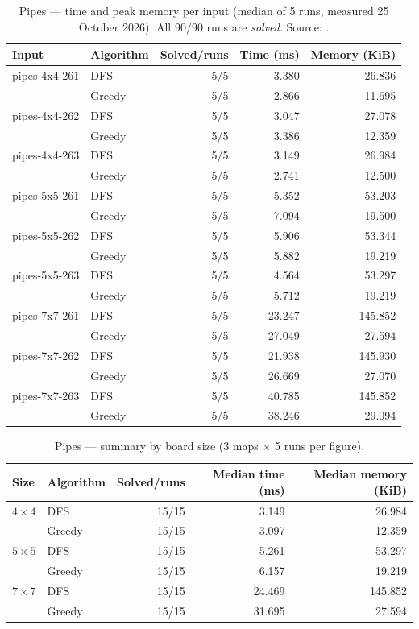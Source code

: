 \begin{table}[h]
\centering\small
\begin{tabular}{@{}llrrr@{}}
\toprule
Input & Algorithm & Solved/runs & Time (ms) & Memory (KiB)\\
\midrule
pipes-4x4-261 & DFS    & 5/5 & 3.380  & 26.836\\
              & Greedy & 5/5 & 2.866  & 11.695\\
\midrule
pipes-4x4-262 & DFS    & 5/5 & 3.047  & 27.078\\
              & Greedy & 5/5 & 3.386  & 12.359\\
\midrule
pipes-4x4-263 & DFS    & 5/5 & 3.149  & 26.984\\
              & Greedy & 5/5 & 2.741  & 12.500\\
\midrule
pipes-5x5-261 & DFS    & 5/5 & 5.352  & 53.203\\
              & Greedy & 5/5 & 7.094  & 19.500\\
\midrule
pipes-5x5-262 & DFS    & 5/5 & 5.906  & 53.344\\
              & Greedy & 5/5 & 5.882  & 19.219\\
\midrule
pipes-5x5-263 & DFS    & 5/5 & 4.564  & 53.297\\
              & Greedy & 5/5 & 5.712  & 19.219\\
\midrule
pipes-7x7-261 & DFS    & 5/5 & 23.247 & 145.852\\
              & Greedy & 5/5 & 27.049 & 27.594\\
\midrule
pipes-7x7-262 & DFS    & 5/5 & 21.938 & 145.930\\
              & Greedy & 5/5 & 26.669 & 27.070\\
\midrule
pipes-7x7-263 & DFS    & 5/5 & 40.785 & 145.852\\
              & Greedy & 5/5 & 38.246 & 29.094\\
\bottomrule
\end{tabular}
\caption{Pipes --- time and peak memory per input (median of 5 runs, measured
25 October 2026). All 90/90 runs are \emph{solved}. Source:
.}
\label{tab:pipes-per-input-en}
\end{table}

\begin{table}[h]
\centering\small
\begin{tabular}{@{}llrrr@{}}
\toprule
Size & Algorithm & Solved/runs & Median time (ms) & Median memory (KiB)\\
\midrule
$4\times4$ & DFS    & 15/15 & 3.149  & 26.984\\
           & Greedy & 15/15 & 3.097  & 12.359\\
$5\times5$ & DFS    & 15/15 & 5.261  & 53.297\\
           & Greedy & 15/15 & 6.157  & 19.219\\
$7\times7$ & DFS    & 15/15 & 24.469 & 145.852\\
           & Greedy & 15/15 & 31.695 & 27.594\\
\bottomrule
\end{tabular}
\caption{Pipes --- summary by board size (3 maps $\times$ 5 runs per figure).}
\label{tab:pipes-summary-en}
\end{table}

